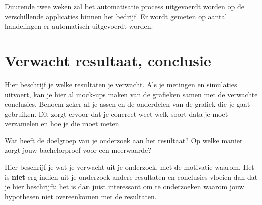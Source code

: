 Duurende twee weken zal het automatisatie process uitgevoerdt worden op de verschillende applicaties binnen het bedrijf.
Er wordt gemeten op aantal handelingen er automatisch uitgevoerdt worden.

\section{Verwacht resultaat, conclusie}
\label{sec:verwachte_resultaten}

Hier beschrijf je welke resultaten je verwacht. Als je metingen en simulaties uitvoert, kan je hier al mock-ups maken van de grafieken samen met de verwachte conclusies. Benoem zeker al je assen en de onderdelen van de grafiek die je gaat gebruiken. Dit zorgt ervoor dat je concreet weet welk soort data je moet verzamelen en hoe je die moet meten.

Wat heeft de doelgroep van je onderzoek aan het resultaat? Op welke manier zorgt jouw bachelorproef voor een meerwaarde?

Hier beschrijf je wat je verwacht uit je onderzoek, met de motivatie waarom. Het is \textbf{niet} erg indien uit je onderzoek andere resultaten en conclusies vloeien dan dat je hier beschrijft: het is dan juist interessant om te onderzoeken waarom jouw hypothesen niet overeenkomen met de resultaten.

